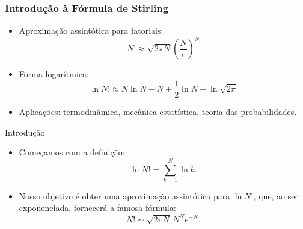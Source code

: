 \documentclass[11pt]{beamer}
\begin{document}
\begin{frame}
\frametitle{Introdução à Fórmula de Stirling}
\begin{itemize}
\item Aproximação assintótica para fatoriais:
\[ N! \approx \sqrt{2\pi N} \left( \frac{N}{e} \right)^N \]
\item Forma logarítmica:
\[ \ln N! \approx N \ln N - N + \frac{1}{2} \ln N + \ln \sqrt{2\pi} \]
\item Aplicações: termodinâmica, mecânica estatística, teoria das probabilidades.
\end{itemize}
\end{frame}


\begin{frame}{Introdução}
  \begin{itemize}
    \item Começamos com a definição:
      \[
      \ln N! = \sum_{k=1}^{N} \ln k.
      \]
    \item Nosso objetivo é obter uma aproximação assintótica para $\ln N!$, que, ao ser exponenciada, fornecerá a famosa fórmula:
      \[
      N! \sim \sqrt{2\pi N}\, N^N e^{-N}.
      \]
  \end{itemize}
\end{frame}
\end{document}
